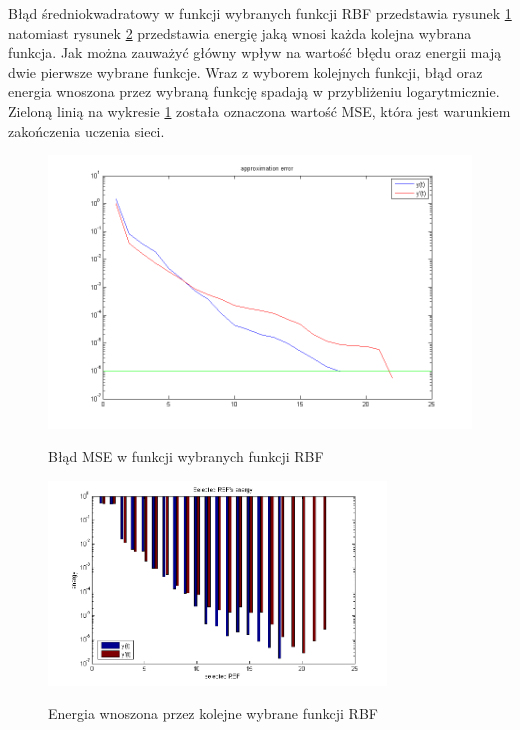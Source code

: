 \clearpage

Błąd średniokwadratowy w funkcji wybranych funkcji RBF przedstawia rysunek \ref{img:prediction_error} natomiast rysunek \ref{img:energy} przedstawia energię jaką wnosi każda kolejna wybrana funkcja. Jak można zauważyć główny wpływ na wartość błędu oraz energii mają dwie pierwsze wybrane funkcje. Wraz z wyborem kolejnych funkcji, błąd oraz energia wnoszona przez wybraną funkcję spadają w przybliżeniu logarytmicznie. Zieloną linią na wykresie \ref{img:prediction_error} została oznaczona wartość MSE, która jest warunkiem zakończenia uczenia sieci.

\begin{figure}[ht!]
	\centering

	{\includegraphics[width=\textwidth]
	{images/approximation_error.png}}

	\caption{Błąd MSE w funkcji wybranych funkcji RBF}
	\label{img:prediction_error}
\end{figure}


\begin{figure}[ht!]
	\centering

	{\includegraphics[width=0.8\textwidth]
	{images/rbfs_energy.png}}

	\caption{Energia wnoszona przez kolejne wybrane funkcji RBF}
	\label{img:energy}
\end{figure}


